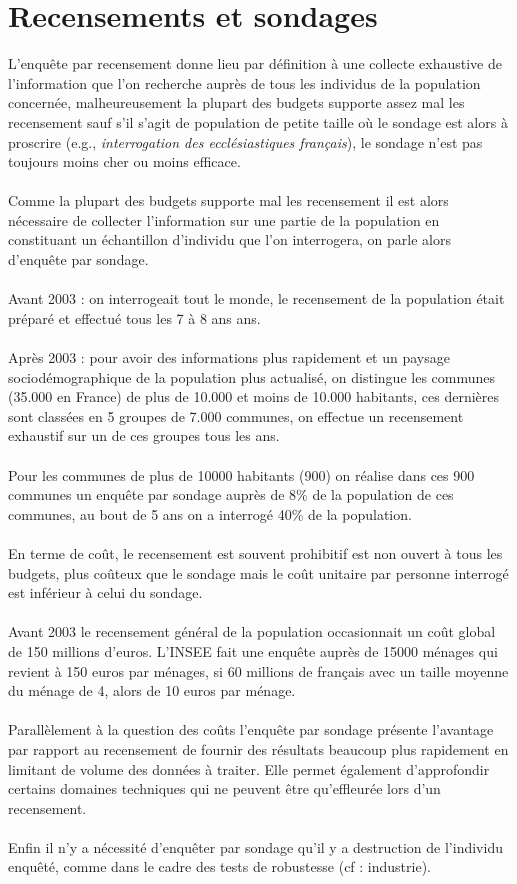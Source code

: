 \documentclass{article}
\begin{document}
\section{Recensements et sondages}
L'enquête par recensement donne lieu par définition à une collecte exhaustive de l'information que l'on recherche auprès de tous les individus de la population concernée, malheureusement la plupart des budgets supporte assez mal les recensement sauf s'il s'agit de population de petite taille où le sondage est alors à proscrire (e.g., \textit{interrogation des ecclésiastiques français}), le sondage n'est pas toujours moins cher ou moins efficace. \\ \\
Comme la plupart des budgets supporte mal les recensement il est alors nécessaire de collecter l'information sur une partie de la population en constituant un échantillon d'individu que l'on interrogera, on parle alors d'enquête par sondage. \\ \\
Avant 2003 : on interrogeait tout le monde, le recensement de la population était préparé et effectué tous les 7 à 8 ans ans. \\ \\
Après 2003 : pour avoir des informations plus rapidement et un paysage sociodémographique de la population plus actualisé, on distingue les communes (35.000 en France) de plus de 10.000 et moins de 10.000 habitants, ces dernières sont classées en 5 groupes de 7.000 communes, on effectue un recensement exhaustif sur un de ces groupes tous les ans. \\ \\
Pour les communes de plus de 10000 habitants (900) on réalise dans ces 900 communes un enquête par sondage auprès de 8\% de la population de ces communes, au bout de 5 ans on a interrogé 40\% de la population. \\ \\
En terme de coût, le recensement est souvent prohibitif est non ouvert à tous les budgets, plus coûteux que le sondage mais le coût unitaire par personne interrogé est inférieur à celui du sondage. \\ \\
Avant 2003 le recensement général de la population occasionnait un coût global de 150 millions d'euros. L'INSEE fait une enquête auprès de 15000 ménages qui revient à 150 euros par ménages, si 60 millions de français avec un taille moyenne du ménage de 4, alors de 10 euros par ménage. \\ \\
Parallèlement à la question des coûts l'enquête par sondage présente l'avantage par rapport au recensement de fournir des résultats beaucoup plus rapidement en limitant de volume des données à traiter. Elle permet également d'approfondir certains domaines techniques qui ne peuvent être qu'effleurée lors d'un recensement. \\ \\
Enfin il n'y a nécessité d'enquêter par sondage qu'il y a destruction de l'individu enquêté, comme dans le cadre des tests de robustesse (cf : industrie).
\end{document}
